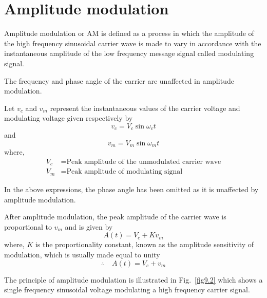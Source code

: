 \section{Amplitude modulation}\label{sec9.7}

Amplitude modulation or AM is defined as a process in which the amplitude of the high frequency sinusoidal carrier wave is made to vary in accordance with the instantaneous amplitude of the low frequency message signal called modulating signal.

The frequency and phase angle of the carrier are unaffected in amplitude modulation.

Let $v_{c}$ and $v_{m}$ represent the instantaneous values of the carrier voltage and modulating voltage given respectively by
\begin{equation}
v_{c}=V_{c}\sin \omega_{c}t\label{eq9.4}
\end{equation}
and
\begin{equation}
v_{m}=V_{m}\sin \omega_{m}t\label{eq9.5}
\end{equation}
where,
\vskip -1cm
\begin{align*}
V_{c} &= \text{Peak amplitude of the unmodulated carrier wave}\\[3pt]
V_{m} &=\text{Peak amplitude of modulating signal}
\end{align*}

In the above expressions, the phase angle has been omitted as it is unaffected by amplitude modulation.

After amplitude modulation, the peak amplitude of the carrier wave is proportional to $v_{m}$ and is given by
\begin{equation}
A(t)=V_{c}+Kv_{m}\label{eq9.6}
\end{equation}
where, $K$ is the proportionality constant, known as the amplitude sensitivity of modulation, which is usually made equal to unity
\begin{equation}
\therefore\quad A(t)=V_{c}+v_{m}\label{eq9.7}
\end{equation}

The principle of amplitude modulation is illustrated in Fig.~\ref{fig9.2} which shows a single frequency sinusoidal voltage modulating a high frequency carrier signal.

